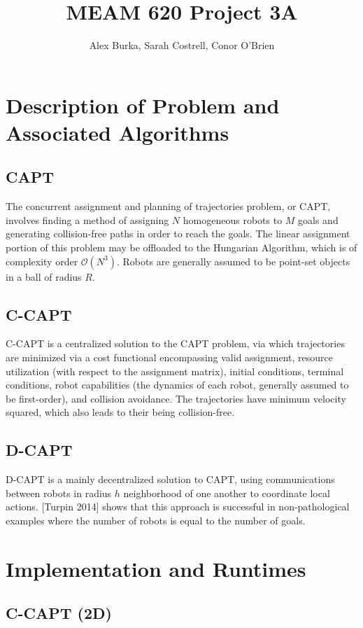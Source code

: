 \documentclass[11pt]{article}
\begin{document}
\author{Alex Burka, Sarah Costrell, Conor O'Brien}
\title{MEAM 620 Project 3A}
\maketitle

\section{Description of Problem and Associated Algorithms}

\subsection{CAPT}
The concurrent assignment and planning of trajectories problem, or CAPT, involves finding a method of assigning $N$ homogeneous robots to $M$ goals and generating collision-free paths in order to reach the goals. The linear assignment portion of this problem may be offloaded to the Hungarian Algorithm, which is of complexity order $\mathcal{O}(N^3)$. Robots are generally assumed to be point-set objects in a ball of radius $R$.

\subsection{C-CAPT}
C-CAPT is a centralized solution to the CAPT problem, via which trajectories are minimized via a cost functional encompassing valid assignment, resource utilization (with respect to the assignment matrix), initial conditions, terminal conditions, robot capabilities (the dynamics of each robot, generally assumed to be first-order), and collision avoidance. The trajectories have minimum velocity squared, which also leads to their being collision-free. 

\subsection{D-CAPT}
D-CAPT is a mainly decentralized solution to CAPT, using communications between robots in radius $h$ neighborhood of one another to coordinate local actions. [Turpin 2014] shows that this approach is successful in non-pathological examples where the number of robots is equal to the number of goals.

\section{Implementation and Runtimes}
\subsection{C-CAPT (2D)}
\end{document}
